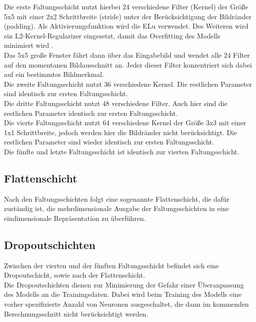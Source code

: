 Die erste Faltungsschicht nutzt hierbei 24 verschiedene Filter (Kernel) der Größe 5x5 mit einer 2x2 Schrittbreite (stride) unter der Berücksichtigung der Bildränder (padding). Als Aktivierungsfunktion wird die ELu verwendet. Des Weiteren wird ein L2-Kernel-Regularizer eingesetzt, damit das Overfitting des Modells minimiert wird \cite{tensorflow2}.  \\ 
Das 5x5 große Fenster fährt dann über das Eingabebild und wendet alle 24 Filter auf den momentanen Bildausschnitt an. Jeder dieser Filter konzentriert sich dabei auf ein bestimmtes Bildmerkmal. \\

Die zweite Faltungsschicht nutzt 36 verschiedene Kernel. Die restlichen Parameter sind identisch zur ersten Faltungsschicht. \\

Die dritte Faltungsschicht nutzt 48 verschiedene Filter. Auch hier sind die restlichen Parameter identisch zur ersten Faltungsschicht. \\

Die vierte Faltungsschicht nutzt 64 verschiedene Kernel der Größe 3x3 mit einer 1x1 Schrittbreite, jedoch werden hier die Bildränder nicht berücksichtigt. Die restlichen Parameter sind wieder identisch zur ersten Faltungsschicht. \\

Die fünfte und letzte Faltungsschicht ist identisch zur vierten Faltungsschicht.

\subsection{Flattenschicht}

Nach den Faltungsschichten folgt eine sogenannte Flattenschicht, die dafür zuständig ist, die mehrdimensionale Ausgabe der Faltungsschichten  in eine eindimensionale Repräsentation zu überführen. \cite{hhu}

\subsection{Dropoutschichten}

Zwischen der vierten und der fünften Faltungsschicht befindet sich eine Dropoutschicht, sowie nach der Flattenschicht. \\ Die Dropoutschichten dienen zur Minimierung der Gefahr einer Überanpassung des Modells an die Trainingsdaten. Dabei wird beim Training des Modells eine vorher spezifizierte Anzahl von Neuronen ausgeschaltet, die dann im kommenden Berechnungsschritt nicht berücksichtigt werden. \cite{wiki2}

